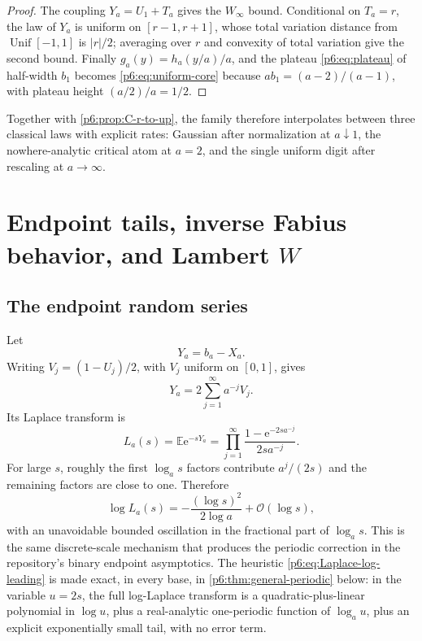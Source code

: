 \documentclass[11pt,oneside]{article}
\numberwithin{equation}{section}
\theoremstyle{definition}
\theoremstyle{remark}
\newcommand{\E}{\mathbb E}
\newcommand{\e}{\mathrm e}
\newcommand{\bigO}{\mathcal O}
\begin{document}
\begin{proof}
The coupling $Y_a=U_1+T_a$ gives the $W_\infty$ bound.  Conditional on
$T_a=r$, the law of $Y_a$ is uniform on $[r-1,r+1]$, whose total variation
distance from $\operatorname{Unif}[-1,1]$ is $|r|/2$; averaging over $r$ and
convexity of total variation give the second bound.  Finally
$g_a(y)=h_a(y/a)/a$, and the plateau \eqref{p6:eq:plateau} of half-width $b_1$
becomes \eqref{p6:eq:uniform-core} because $ab_1=(a-2)/(a-1)$, with plateau
height $(a/2)/a=1/2$.
\end{proof}

Together with \cref{p6:prop:C-r-to-up}, the family therefore interpolates
between three classical laws with explicit rates: Gaussian after normalization
at $a\downarrow1$, the nowhere-analytic critical atom at $a=2$, and the
single uniform digit after rescaling at $a\to\infty$.

\section{Endpoint tails, inverse Fabius behavior, and Lambert \texorpdfstring{$W$}{W}}
\label{p6:sec:general-laplace}

\subsection{The endpoint random series}

Let
\begin{equation}\label{p6:eq:Ya}
 Y_a=b_a-X_a.
\end{equation}
Writing $V_j=(1-U_j)/2$, with $V_j$ uniform on $[0,1]$, gives
\begin{equation}\label{p6:eq:Ya-series}
 Y_a=2\sum_{j=1}^{\infty}a^{-j}V_j.
\end{equation}
Its Laplace transform is
\begin{equation}\label{p6:eq:Ya-Laplace}
 L_a(s)=\E\e^{-sY_a}
 =\prod_{j=1}^{\infty}
 \frac{1-\e^{-2sa^{-j}}}{2sa^{-j}}.
\end{equation}
For large $s$, roughly the first $\log_a s$ factors contribute
$a^j/(2s)$ and the remaining factors are close to one.  Therefore
\begin{equation}\label{p6:eq:Laplace-log-leading}
 \log L_a(s)
 =-\frac{(\log s)^2}{2\log a}
 +\bigO(\log s),
\end{equation}
with an unavoidable bounded oscillation in the fractional part of $\log_a s$.
This is the same discrete-scale mechanism that produces the periodic correction
in the repository's binary endpoint asymptotics.  The heuristic
\eqref{p6:eq:Laplace-log-leading} is made exact, in every base, in
\cref{p6:thm:general-periodic} below: in the variable $u=2s$, the full
log-Laplace transform is a quadratic-plus-linear polynomial in $\log u$, plus a
real-analytic one-periodic function of $\log_au$, plus an explicit
exponentially small tail, with no error term.
\end{document}
